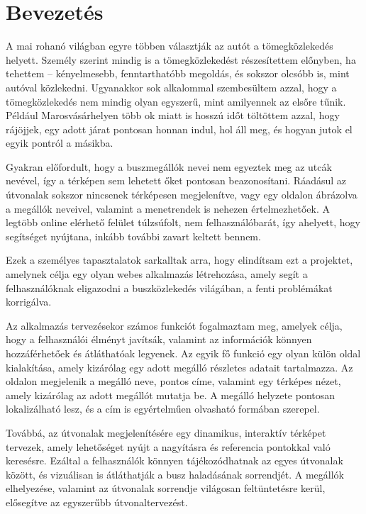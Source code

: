 \section{Bevezetés}

\indent A mai rohanó világban egyre többen választják az autót a tömegközlekedés helyett. Személy szerint mindig is a tömegközlekedést részesítettem előnyben, ha tehettem – kényelmesebb, fenntarthatóbb megoldás, és sokszor olcsóbb is, mint autóval közlekedni. Ugyanakkor sok alkalommal szembesültem azzal, hogy a tömegközlekedés nem mindig olyan egyszerű, mint amilyennek az elsőre tűnik. Például Marosvásárhelyen több ok miatt is hosszú időt töltöttem azzal, hogy rájöjjek, egy adott járat pontosan honnan indul, hol áll meg, és hogyan jutok el egyik pontról a másikba.

Gyakran előfordult, hogy a buszmegállók nevei nem egyeztek meg az utcák nevével, így a térképen sem lehetett őket pontosan beazonosítani. Ráadásul az útvonalak sokszor nincsenek térképesen megjelenítve, vagy egy oldalon ábrázolva a megállók neveivel, valamint a menetrendek is nehezen értelmezhetőek. A legtöbb online elérhető felület túlzsúfolt, nem felhasználóbarát, így ahelyett, hogy segítséget nyújtana, inkább további zavart keltett bennem.

Ezek a személyes tapasztalatok sarkalltak arra, hogy elindítsam ezt a projektet, amelynek célja egy olyan webes alkalmazás létrehozása, amely segít a felhasználóknak eligazodni a buszközlekedés világában, a fenti problémákat korrigálva.

\indent Az alkalmazás tervezésekor számos funkciót fogalmaztam meg, amelyek célja, hogy a felhasználói élményt javítsák, valamint az információk könnyen hozzáférhetőek és átláthatóak legyenek. Az egyik fő funkció egy olyan külön oldal kialakítása, amely kizárólag egy adott megálló részletes adatait tartalmazza. Az oldalon megjelenik a megálló neve, pontos címe, valamint egy térképes nézet, amely kizárólag az adott megállót mutatja be. A megálló helyzete pontosan lokalizálható lesz, és a cím is egyértelműen olvasható formában szerepel.

Továbbá, az útvonalak megjelenítésére egy dinamikus, interaktív térképet tervezek, amely lehetőséget nyújt a nagyításra és referencia pontokkal való keresésre. Ezáltal a felhasználók könnyen tájékozódhatnak az egyes útvonalak között, és vizuálisan is átláthatják a busz haladásának sorrendjét. A megállók elhelyezése, valamint az útvonalak sorrendje világosan feltüntetésre kerül, elősegítve az egyszerűbb útvonaltervezést.

